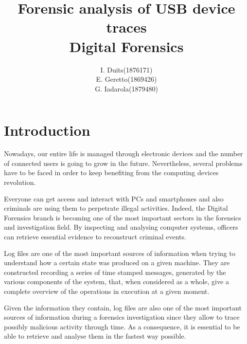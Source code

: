 \documentclass[a4paper,twocolumn]{article}
\title{Forensic analysis of USB device traces\\
\large Digital Forensics}
\author{
\begin{tabular}{>{\raggedleft}m{5cm}m{5cm}}
I. Duits & (1876171) \\
E. Geretto & (1869426) \\
G. Iadarola & (1879480) \\
\end{tabular}
}
\begin{document}
\maketitle


\section{Introduction}
\label{sec:intro}
Nowadays, our entire life is managed through electronic devices and the number
of connected users is going to grow in the future. Nevertheless, several
problems have to be faced in order to keep benefiting from the computing devices
revolution.

Everyone can get access and interact with PCs and smartphones and also criminals
are using them to perpetrate illegal activities. Indeed, the Digital Forensics
branch is becoming one of the most important sectors in the forensics and
investigation field. By inspecting and analysing computer systems, officers can
retrieve essential evidence to reconstruct criminal events.

Log files are one of the most important sources of information when trying to
understand how a certain state was produced on a given machine. They are
constructed recording a series of time stamped messages, generated by the
various components of the system, that, when considered as a whole, give a
complete overview of the operations in execution at a given moment.

Given the information they contain, log files are also one of the most important
sources of information during a forensics investigation since they allow to
trace possibly malicious activity through time. As a consequence, it is
essential to be able to retrieve and analyse them in the fastest way
possible.~\cite{finlayson1987log}
\end{document}
